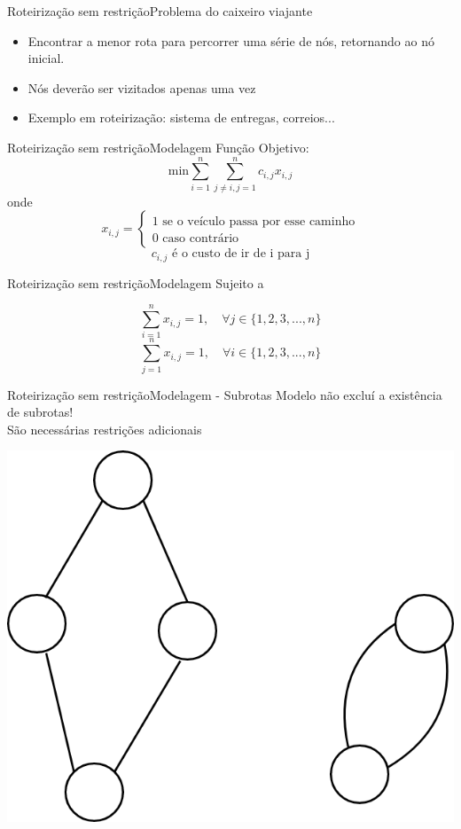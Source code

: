\documentclass{beamer}
\newenvironment{outeritemize}{\begin{itemize}}{\end{itemize}\vspace{12pt}}
\begin{document}
\begin{frame}{Roteirização sem restrição}{Problema do caixeiro viajante}
    \begin{outeritemize}
        \item Encontrar a menor rota para percorrer uma série de nós, retornando ao nó inicial.
        \item Nós deverão ser vizitados apenas uma vez
        \item Exemplo em roteirização: sistema de entregas, correios...

    \end{outeritemize}
\end{frame}

\begin{frame}{Roteirização sem restrição}{Modelagem}
Função Objetivo:
$$
\textrm{min}\sum_{i=1}^{n}\sum_{j \neq i, j=1}^{n} c_{i,j} x_{i,j}
$$
onde
$$
x_{i,j} = \begin{cases}
    1 \textrm{ se o veículo passa por esse caminho} \\
    0 \textrm{ caso contrário}
\end{cases}
$$
$$
c_{i,j} \textrm{ é o custo de ir de i para j}
$$

\end{frame}

\begin{frame}{Roteirização sem restrição}{Modelagem}
Sujeito a

$$
\sum_{i=1}^{n} x_{i,j} = 1, \quad \forall j \in \{1,2,3,...,n\} 
$$
$$
\sum_{j=1}^{n} x_{i,j} = 1, \quad \forall i \in \{1,2,3,...,n\} 
$$

\end{frame}

\begin{frame}{Roteirização sem restrição}{Modelagem - Subrotas}
Modelo não excluí a existência de subrotas!\\
São necessárias restrições adicionais\\
    \begin{center}
        \includegraphics[scale=0.20]{assets/Roteirizacao/sub.png}    
    \end{center}
\end{frame}
\end{document}
